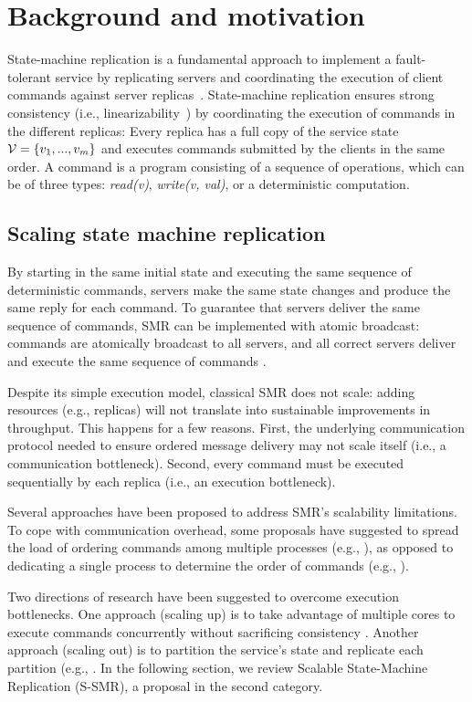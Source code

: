 \section{Background and motivation}
State-machine replication is a fundamental approach to implement a fault-tolerant service by replicating servers and coordinating the execution of client commands against server replicas~\cite{Lam78,Sch90}. 
State-machine replication ensures strong consistency (i.e., linearizability~\cite{Attiya04}) by coordinating the execution of commands in the different replicas: Every replica has a full copy of the service state $\mathcal{V} = \{v_1, ..., v_m\}$ and executes commands submitted by the clients in the same order. A command is a program consisting of a sequence of operations, which can be of three types: \emph{read(v)}, \emph{write(v, val)}, or a deterministic computation.

\subsection{Scaling state machine replication}
By starting in the same initial state and executing the same sequence of deterministic commands, servers make the same state changes and produce the same reply for each command. To guarantee that servers deliver the same sequence of commands, SMR can be implemented with atomic broadcast: commands are atomically broadcast to all servers, and all correct servers deliver and execute the same sequence of commands \cite{BJ87b,DSU04}.

Despite its simple execution model, classical SMR does not scale: adding resources (e.g., replicas) will not translate into sustainable improvements in throughput. This happens for a few reasons. First, the underlying communication protocol needed to ensure ordered message delivery may not scale itself (i.e., a communication bottleneck). Second, every command must be executed sequentially by each replica (i.e., an execution bottleneck).

Several approaches have been proposed to address SMR’s scalability limitations. To cope with communication overhead, some proposals have suggested to spread the load of ordering commands among multiple processes (e.g., \cite{Moraru:2013gw,Mencius,Marandi:2012hb}), as opposed to dedicating a single process to determine the order of commands (e.g., \cite{CT96,Lamport:1998ea}).

Two directions of research have been suggested to overcome execution bottlenecks. One approach (scaling up) is to take advantage of multiple cores to execute commands concurrently without sacrificing consistency \cite{Kapritsos:2012um,Marandi:2014bj,Kotla:2004ep,Guo:2014jp}. Another approach (scaling out) is to partition the service's state and replicate each partition (e.g., \cite{Glendenning:2011kj,Marandi:2011dj}. In the following section, we review Scalable State-Machine Replication (S-SMR), a proposal in the second category.

